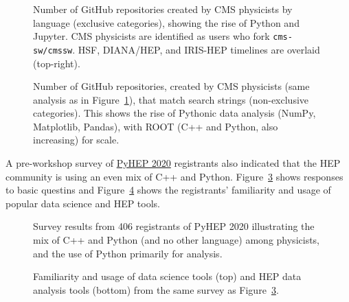 \documentclass{article}
\begin{document}
\begin{figure}

\caption{Number of GitHub repositories created by CMS physicists by language (exclusive categories), showing the rise of Python and Jupyter. CMS physicists are identified as users who fork {\tt cms-sw/cmssw}. HSF, DIANA/HEP, and IRIS-HEP timelines are overlaid (top-right). \label{fig:lhlhc-github-languages-paper}}
\end{figure}

\begin{figure}

\caption{Number of GitHub repositories, created by CMS physicists (same analysis as in Figure~\ref{fig:lhlhc-github-languages-paper}), that match search strings (non-exclusive categories). This shows the rise of Pythonic data analysis (NumPy, Matplotlib, Pandas), with ROOT (C++ and Python, also increasing) for scale. \label{fig:lhlhc-github-overlay-lin-paper}}
\end{figure}

A pre-workshop survey of \href{https://indico.cern.ch/e/PyHEP2020}{PyHEP 2020} registrants also indicated that the HEP community is using an even mix of C++ and Python. Figure~\ref{fig:pyhep2020-survey-paper} shows responses to basic questins and Figure~\ref{fig:lhlhc-familiarity-with-packages-paper} shows the registrants' familiarity and usage of popular data science and HEP tools.

\begin{figure}

\caption{Survey results from 406 registrants of PyHEP 2020 illustrating the mix of C++ and Python (and no other language) among physicists, and the use of Python primarily for analysis. \label{fig:pyhep2020-survey-paper}}
\end{figure}

\begin{figure}

\caption{Familiarity and usage of data science tools (top) and HEP data analysis tools (bottom) from the same survey as Figure~\ref{fig:pyhep2020-survey-paper}. \label{fig:lhlhc-familiarity-with-packages-paper}}
\end{figure}
\end{document}
